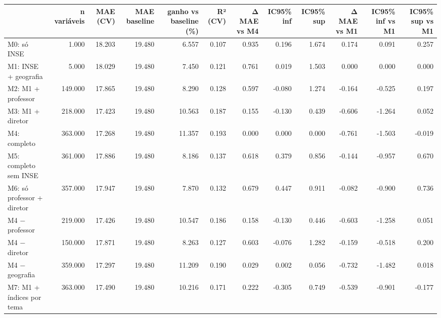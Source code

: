 \begin{tabular}{lrrrrrrrrrrr}
\toprule
 & n variáveis & MAE (CV) & MAE baseline & ganho vs baseline (\%) & R² (CV) & Δ MAE vs M4 & IC95\% inf & IC95\% sup & Δ MAE vs M1 & IC95\% inf vs M1 & IC95\% sup vs M1 \\
\midrule
M0: só INSE & 1.000 & 18.203 & 19.480 & 6.557 & 0.107 & 0.935 & 0.196 & 1.674 & 0.174 & 0.091 & 0.257 \\
M1: INSE + geografia & 5.000 & 18.029 & 19.480 & 7.450 & 0.121 & 0.761 & 0.019 & 1.503 & 0.000 & 0.000 & 0.000 \\
M2: M1 + professor & 149.000 & 17.865 & 19.480 & 8.290 & 0.128 & 0.597 & -0.080 & 1.274 & -0.164 & -0.525 & 0.197 \\
M3: M1 + diretor & 218.000 & 17.423 & 19.480 & 10.563 & 0.187 & 0.155 & -0.130 & 0.439 & -0.606 & -1.264 & 0.052 \\
M4: completo & 363.000 & 17.268 & 19.480 & 11.357 & 0.193 & 0.000 & 0.000 & 0.000 & -0.761 & -1.503 & -0.019 \\
M5: completo sem INSE & 361.000 & 17.886 & 19.480 & 8.186 & 0.137 & 0.618 & 0.379 & 0.856 & -0.144 & -0.957 & 0.670 \\
M6: só professor + diretor & 357.000 & 17.947 & 19.480 & 7.870 & 0.132 & 0.679 & 0.447 & 0.911 & -0.082 & -0.900 & 0.736 \\
M4 − professor & 219.000 & 17.426 & 19.480 & 10.547 & 0.186 & 0.158 & -0.130 & 0.446 & -0.603 & -1.258 & 0.051 \\
M4 − diretor & 150.000 & 17.871 & 19.480 & 8.263 & 0.127 & 0.603 & -0.076 & 1.282 & -0.159 & -0.518 & 0.200 \\
M4 − geografia & 359.000 & 17.297 & 19.480 & 11.209 & 0.190 & 0.029 & 0.002 & 0.056 & -0.732 & -1.482 & 0.018 \\
M7: M1 + índices por tema & 363.000 & 17.490 & 19.480 & 10.216 & 0.171 & 0.222 & -0.305 & 0.749 & -0.539 & -0.901 & -0.177 \\
\bottomrule
\end{tabular}
